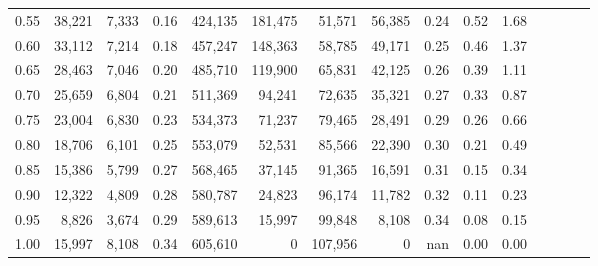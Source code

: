 \begin{tabular}{rrrcrrrrrrrrrrr}
0.55 &  38,221 &  7,333 &                                       0.16 &  424,135 &  181,475 &   51,571 &   56,385 &  0.24 &  0.52 &                         1.68 \\
0.60 &  33,112 &  7,214 &                                       0.18 &  457,247 &  148,363 &   58,785 &   49,171 &  0.25 &  0.46 &                         1.37 \\
0.65 &  28,463 &  7,046 &                                       0.20 &  485,710 &  119,900 &   65,831 &   42,125 &  0.26 &  0.39 &                         1.11 \\
0.70 &  25,659 &  6,804 &                                       0.21 &  511,369 &   94,241 &   72,635 &   35,321 &  0.27 &  0.33 &                         0.87 \\
0.75 &  23,004 &  6,830 &                                       0.23 &  534,373 &   71,237 &   79,465 &   28,491 &  0.29 &  0.26 &                         0.66 \\
0.80 &  18,706 &  6,101 &                                       0.25 &  553,079 &   52,531 &   85,566 &   22,390 &  0.30 &  0.21 &                         0.49 \\
0.85 &  15,386 &  5,799 &                                       0.27 &  568,465 &   37,145 &   91,365 &   16,591 &  0.31 &  0.15 &                         0.34 \\
0.90 &  12,322 &  4,809 &                                       0.28 &  580,787 &   24,823 &   96,174 &   11,782 &  0.32 &  0.11 &                         0.23 \\
0.95 &   8,826 &  3,674 &                                       0.29 &  589,613 &   15,997 &   99,848 &    8,108 &  0.34 &  0.08 &                         0.15 \\
1.00 &  15,997 &  8,108 &                                       0.34 &  605,610 &        0 &  107,956 &        0 &   nan &  0.00 &                         0.00 \\
\bottomrule
\end{tabular}
